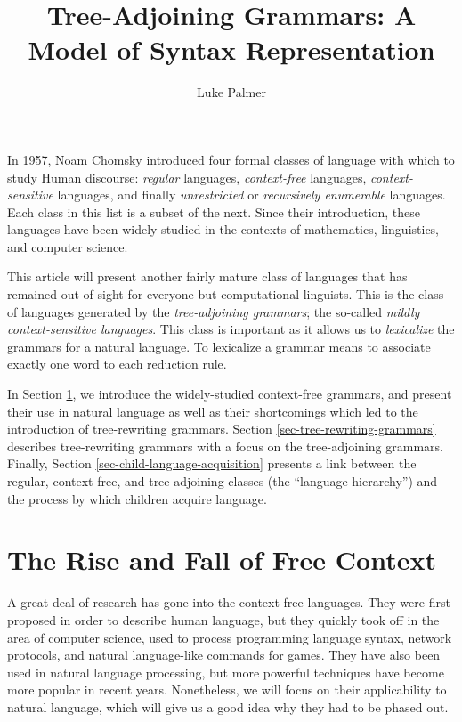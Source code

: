 \documentclass[12pt]{article}
\title{Tree-Adjoining Grammars: A Model of Syntax Representation}
\author{Luke Palmer}
\newcommand{\defn}[1]{\textit{#1}}
\begin{document}
\maketitle
\doublespace

In 1957, Noam Chomsky introduced four formal classes of language with
which to study Human discourse:  \defn{regular} languages,
\defn{context-free} languages, \defn{context-sensitive} languages, and
finally \defn{unrestricted} or \defn{recursively enumerable} languages.
Each class in this list is a subset of the next.  Since their
introduction, these languages have been widely studied in the contexts
of mathematics, linguistics, and computer science.

This article will present another fairly mature class of languages that
has remained out of sight for everyone but computational linguists.
This is the class of languages generated by the \defn{tree-adjoining
grammars}; the so-called \defn{mildly context-sensitive languages}.
This class is important as it allows us to \defn{lexicalize} the
grammars for a natural language.  To lexicalize a grammar means to
associate exactly one word to each reduction rule.

In Section \ref{sec-free-context}, we introduce the widely-studied
context-free grammars, and present their use in natural language as well
as their shortcomings which led to the introduction of tree-rewriting
grammars.  Section \ref{sec-tree-rewriting-grammars} describes
tree-rewriting grammars with a focus on the tree-adjoining grammars.
Finally, Section \ref{sec-child-language-acquisition} presents a link
between the regular, context-free, and tree-adjoining classes (the
``language hierarchy'') and the process by which children acquire
language.

\section{The Rise and Fall of Free Context}
\label{sec-free-context}

A great deal of research has gone into the context-free languages.  They
were first proposed in order to describe human language, but they
quickly took off in the area of computer science, used to process
programming language syntax, network protocols, and natural
language-like commands for games.  They have also been used in natural
language processing, but more powerful techniques have become more
popular in recent years.  Nonetheless, we will focus on their
applicability to natural language, which will give us a good idea why
they had to be phased out.
\end{document}
